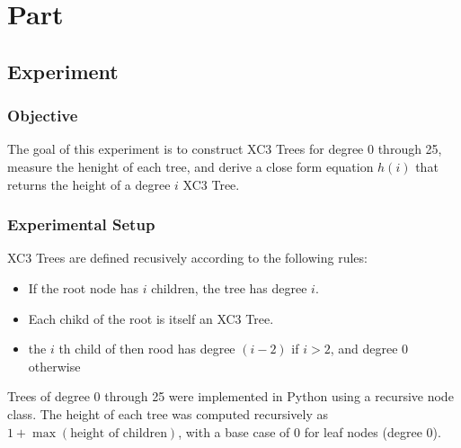 \documentclass[letterpaper]{article}
\theoremstyle{plain}
\theoremstyle{definition}
\theoremstyle{remark}
\newcounter{experiment}
\begin{document}
\section*{Part \thesection}

\subsection*{Experiment \theexperiment}
\label{exp3}

\subsubsection*{Objective}
The goal of this experiment is to construct XC3 Trees for degree 0 through 25, measure the henight of each tree, 
and derive a close form equation $h(i)$ that returns the height of a degree $i$ XC3 Tree.

\subsubsection*{Experimental Setup}
XC3 Trees are defined recusively according to the following rules:
\begin{itemize}
    \item  If the root node has $i$ children, the tree has degree $i$.
    \item Each chikd of the root is itself an XC3 Tree.
    \item the $i$ th child of then rood has degree $(i-2)$ if $i > 2$, and degree 0 otherwise
\end{itemize}

Trees of degree 0 through 25 were implemented in Python using a recursive node class. The height of each tree was computed
recursively as $1 + \max(\text{height of children})$, with a base case of 0 for leaf nodes (degree 0).
\end{document}
